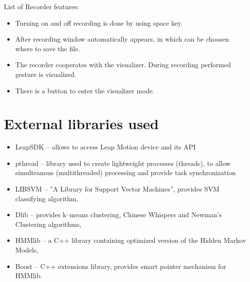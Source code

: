 List of Recorder features:
\begin{itemize}
\item Turning on and off recording is done by using space key.
\item After recording window automatically appears, in which can be choosen where to save the file.
\item The recorder cooperates with the visualizer. During recording performed gesture is visualized.
\item There is a button to enter the visualizer mode.
\end{itemize}

\section{External libraries used} \label{librariesSection}

\begin{itemize}
\item LeapSDK -- allows to access Leap Motion device and its API
\item pthread -- library used to create lightweight processes (threads), to allow simulteanous (multithreaded) processing and provide task synchronization
\item LIBSVM -- ''A Library for Support Vector Machines'', provides SVM classifying algorithm,
\item Dlib -- provides k--means clustering, Chinese Whispers and Newman's Clustering algorithms,
\item HMMlib -- a C++ library containing optimized version of the Hidden Markov Models,
\item Boost -- C++ extensions library, provides smart pointer mechanism for HMMlib.
\end{itemize}
